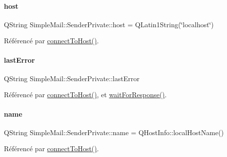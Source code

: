 \paragraph{\texorpdfstring{host}{host}}
{\footnotesize\ttfamily Q\+String Simple\+Mail\+::\+Sender\+Private\+::host = Q\+Latin1\+String(\char`\"{}localhost\char`\"{})}



Référencé par \hyperlink{class_simple_mail_1_1_sender_private_aa2f9a37cfe58c3e39afa75e79070cee1}{connect\+To\+Host()}.

\mbox{\label{class_simple_mail_1_1_sender_private_a90ae4ff740007836307ede01aad3a277}} 
\paragraph{\texorpdfstring{last\+Error}{lastError}}
{\footnotesize\ttfamily Q\+String Simple\+Mail\+::\+Sender\+Private\+::last\+Error}



Référencé par \hyperlink{class_simple_mail_1_1_sender_private_aa2f9a37cfe58c3e39afa75e79070cee1}{connect\+To\+Host()}, et \hyperlink{class_simple_mail_1_1_sender_private_af8ba23dc3e1201d303ad1d923235c71c}{wait\+For\+Response()}.

\mbox{\label{class_simple_mail_1_1_sender_private_a9daecd69dd0c84595a9c3288f98094b4}} 
\paragraph{\texorpdfstring{name}{name}}
{\footnotesize\ttfamily Q\+String Simple\+Mail\+::\+Sender\+Private\+::name = Q\+Host\+Info\+::local\+Host\+Name()}



Référencé par \hyperlink{class_simple_mail_1_1_sender_private_aa2f9a37cfe58c3e39afa75e79070cee1}{connect\+To\+Host()}.

\mbox{\label{class_simple_mail_1_1_sender_private_aac5b192258bcf97c2249fc944c17ee32}} 
